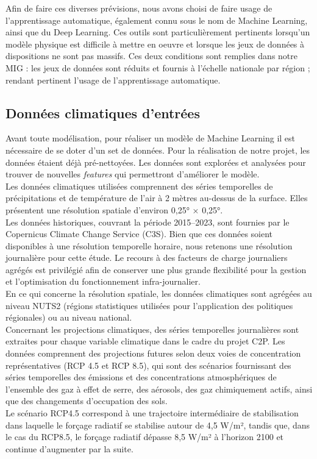 \documentclass{article}
\theoremstyle{nopointbreak}
\theoremstyle{nobrkbold}
\begin{document}
Afin de faire ces diverses prévisions, nous avons choisi de faire usage de l'apprentissage automatique, également connu sous le nom de Machine Learning, ainsi que du Deep Learning. Ces outils sont particulièrement pertinents lorsqu'un modèle physique est difficile à mettre en oeuvre et lorsque les jeux de données à dispositions ne sont pas massifs. Ces deux conditions sont remplies dans notre MIG : les jeux de données sont réduits et fournis à l'échelle nationale par région ; rendant pertinent l'usage de l'apprentissage automatique.\\


\subsection{Données climatiques d'entrées}

Avant toute modélisation, pour réaliser un modèle de Machine Learning il est nécessaire de se doter d'un set de données. Pour la réalisation de notre projet, les données étaient déjà pré-nettoyées. Les données sont explorées et analysées pour trouver de nouvelles \textit{features} qui permettront d'améliorer le modèle. \\

Les données climatiques utilisées comprennent des séries temporelles de précipitations et de température de l’air à 2 mètres au-dessus de la surface. Elles présentent une résolution spatiale d’environ 0,25° × 0,25°.\\

Les données historiques, couvrant la période 2015–2023, sont fournies par le Copernicus Climate Change Service (C3S). Bien que ces données soient disponibles à une résolution temporelle horaire, nous retenons une résolution journalière pour cette étude. Le recours à des facteurs de charge journaliers agrégés est privilégié afin de conserver une plus grande flexibilité pour la gestion et l’optimisation du fonctionnement infra-journalier.\\

En ce qui concerne la résolution spatiale, les données climatiques sont agrégées au niveau NUTS2 (régions statistiques utilisées pour l’application des politiques régionales) ou au niveau national.\\

Concernant les projections climatiques, des séries temporelles journalières sont extraites pour chaque variable climatique dans le cadre du projet C2P. Les données comprennent des projections futures selon deux voies de concentration représentatives (RCP 4.5 et RCP 8.5), qui sont des scénarios fournissant des séries temporelles des émissions et des concentrations atmosphériques de l’ensemble des gaz à effet de serre, des aérosols, des gaz chimiquement actifs, ainsi que des changements d’occupation des sols.
\\
Le scénario RCP4.5 correspond à une trajectoire intermédiaire de stabilisation dans laquelle le forçage radiatif se stabilise autour de 4,5 W/m², tandis que, dans le cas du RCP8.5, le forçage radiatif dépasse 8,5 W/m² à l’horizon 2100 et continue d’augmenter par la suite.
\\
\end{document}
